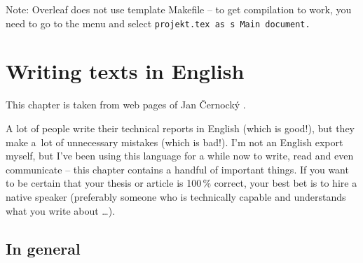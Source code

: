 Note: Overleaf does not use template Makefile -- to get compilation to work, you need to go to the menu and select \tt projekt.tex \rm as s Main document.

\chapter{Writing texts in English}
\label{anglicky}
This chapter is taken from web pages of Jan Černocký \cite{CernockyEnglish}.

A lot of people write their technical reports in English (which is good!), but they make a~lot of unnecessary mistakes (which is bad!). I'm not an English export myself, but I've been using this language for a while now to write, read and even communicate -- this chapter contains a handful of important things. If you want to be certain that your thesis or article is 100\,\% correct, your best bet is to hire a native speaker (preferably someone who is technically capable and understands what you write about \ldots).


\section{In general}

